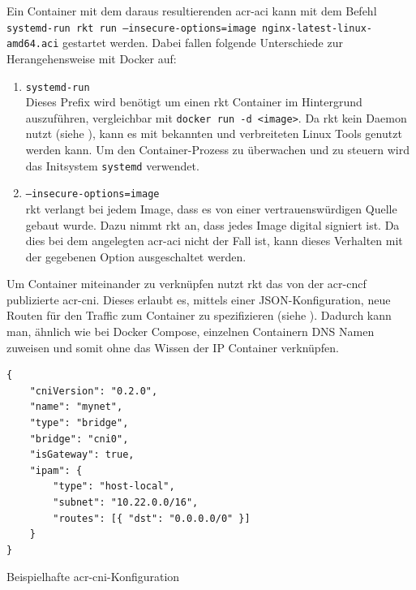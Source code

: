 Ein Container mit dem daraus resultierenden \gls{acr-aci} kann mit dem Befehl \texttt{systemd-run rkt run --insecure-options=image nginx-latest-linux-amd64.aci} gestartet werden. Dabei fallen folgende Unterschiede zur Herangehensweise mit Docker auf:
\begin{enumerate}
	\item \texttt{systemd-run} \\ 
	Dieses Prefix wird benötigt um einen rkt Container im Hintergrund auszuführen, vergleichbar mit \texttt{docker run -d <image>}. Da rkt kein Daemon nutzt (siehe ), kann es mit bekannten und verbreiteten Linux Tools genutzt werden kann. Um den Container-Prozess zu überwachen und zu steuern wird das Initsystem \texttt{systemd} verwendet.
	\item \texttt{--insecure-options=image} \\
	rkt verlangt bei jedem Image, dass es von einer vertrauenswürdigen Quelle gebaut wurde. Dazu nimmt rkt an, dass jedes Image digital signiert ist. Da dies bei dem angelegten \gls{acr-aci} nicht der Fall ist, kann dieses Verhalten mit der gegebenen Option ausgeschaltet werden.
\end{enumerate}

Um Container miteinander zu verknüpfen nutzt rkt das von der \gls{acr-cncf} publizierte \gls{acr-cni}. Dieses erlaubt es, mittels einer JSON-Konfiguration, neue Routen für den Traffic zum Container zu spezifizieren (siehe ). Dadurch kann man, ähnlich wie bei Docker Compose, einzelnen Containern DNS Namen zuweisen und somit ohne das Wissen der IP Container verknüpfen.

\begin{listing}[h]
	\begin{verbatim}
{
	"cniVersion": "0.2.0",
	"name": "mynet",
	"type": "bridge",
	"bridge": "cni0",
	"isGateway": true,
	"ipam": {
		"type": "host-local",
		"subnet": "10.22.0.0/16",
		"routes": [{ "dst": "0.0.0.0/0" }]
	}
}
	\end{verbatim}
	\caption{Beispielhafte \gls{acr-cni}-Konfiguration}
	\label{lst:cniConfig}
\end{listing}


